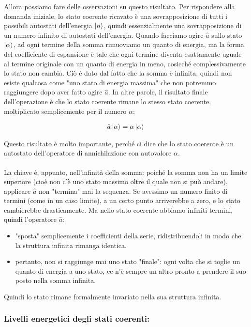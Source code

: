 	Allora possiamo fare delle osservazioni su questo risultato. Per rispondere alla domanda iniziale, lo stato coerente ricavato è una sovrapposizione di tutti i possibili autostati dell'energia $\ket{n}$, quindi essenzialmente una sovrapposizione di un numero infinito di autostati dell'energia. Quando facciamo agire $\hat{a}$ sullo stato $\ket{\alpha}$, ad ogni  termine della somma rimuoviamo un quanto di energia, ma la forma del coefficiente di espansione è tale che ogni termine diventa esattamente uguale al termine originale con un quanto di energia in meno, cosicché complessivamente lo stato non cambia. Ciò è dato dal fatto che la somma è infinita, quindi non esiste qualcosa come "uno stato di energia massima" che non potremmo raggiungere dopo aver fatto agire $\hat{a}$. In altre parole, il risultato finale dell’operazione è che lo stato coerente rimane lo stesso stato coerente, moltiplicato semplicemente per il numero $\alpha$:
	
\begin{align*}
	\hat{a} \ket{\alpha} = \alpha \ket{\alpha}
\end{align*}

	Questo risultato è molto importante, perché ci dice che lo stato coerente è un autostato dell’operatore di annichilazione con autovalore $\alpha$. 
	\\
	\\
	La chiave è, appunto, nell’infinità della somma: poiché la somma non ha un limite superiore (cioè non c’è uno stato massimo oltre il quale non si può andare), applicare $\hat{a}$ non "termina" mai la sequenza. Se avessimo un numero finito di termini (come in un caso limite), a un certo punto arriverebbe a zero, e lo stato cambierebbe drasticamente. Ma nello stato coerente abbiamo infiniti termini, quindi l'operatore $\hat{a}$:
	
\begin{itemize}
	\item "sposta" semplicemente i coefficienti della serie, ridistribuendoli in modo che la struttura infinita rimanga identica.
	\item pertanto, non si raggiunge mai uno stato "finale": ogni volta che si toglie un quanto di energia a uno stato, ce n’è sempre un altro pronto a prendere il suo posto nella somma infinita.
\end{itemize}
	
	Quindi lo stato rimane formalmente invariato nella sua struttura infinita.
	
\subsubsection{Livelli energetici degli stati coerenti:}
	
